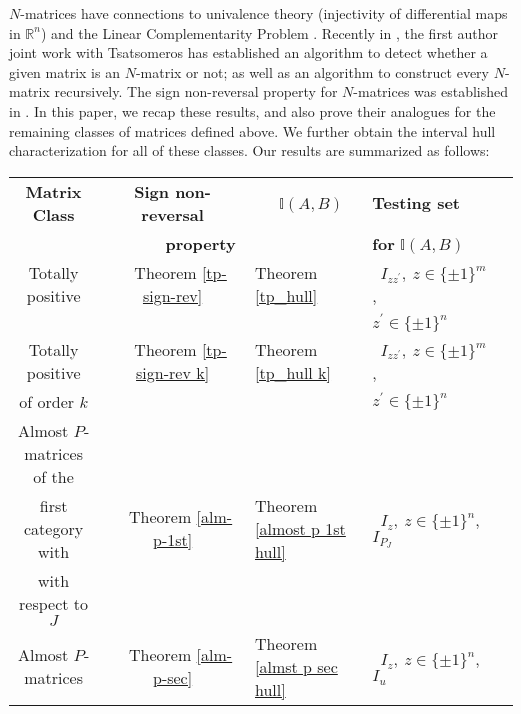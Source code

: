 \documentclass[11pt]{article}
\begin{document}
$N$-matrices have connections to univalence theory (injectivity of
differential maps in $\mathbb{R}^n$) and the Linear Complementarity
Problem \cite{par-rav-nmat}. Recently in \cite{PT20}, the first author joint work with Tsatsomeros has established an algorithm to detect whether a given matrix is an $N$-matrix or not; as well as an algorithm to construct every $N$-matrix recursively. The sign non-reversal property for $N$-matrices was established in \cite{moh-sri-nmat-lcp, par-rav-nmat}. In this paper, we recap these results, and also prove their analogues for the remaining classes of matrices defined above. We further obtain the interval hull characterization for all of these classes. Our results are summarized as follows:
\begin{center}
	
	\begin{tabular}{|c|c|l|l|c|}
		\hline
		
		{\bf Matrix Class} & {\bf Sign non-reversal} & { ~~~\bf $\mathbb{I}(A,B)$} & {\bf Testing set}~\\
		& ~~~~~~~\bf property&& {\bf for} $\mathbb{I}(A,B)$\\
		
		
		\hline Totally positive & ~~Theorem \ref{tp-sign-rev} & Theorem \ref{tp_hull}&~$I_{z z^\prime}, \ z \in \{ \pm 1 \}^m$,\\
		& & & \hspace*{8mm} $z^{\prime} \in \{ \pm 1 \}^n$\\
		
		\hline Totally positive & ~~Theorem \ref{tp-sign-rev k} & Theorem \ref{tp_hull k}&~$I_{z z^\prime}, \ z \in \{ \pm 1 \}^m$,\\
		of order $k$ & && \hspace*{6mm} $z^{\prime} \in \{ \pm 1 \}^n$ \\
		
		\hline Almost $P$-matrices of the & &&\\
		first category with & ~~Theorem \ref{alm-p-1st} & Theorem \ref{almost p 1st hull} &~$I_{z}, \ z \in \{ \pm 1 \}^n$, $I_{P_J}$\\
		with respect to $J$ & && \\
		
		\hline Almost $P$-matrices & ~~Theorem \ref{alm-p-sec} & Theorem \ref{almst p sec hull}&~$I_{z}, \ z \in \{ \pm 1 \}^n$, $I_u$\\
		

\end{tabular}
\end{center}
\end{document}
